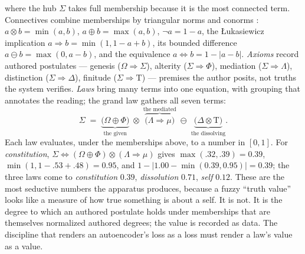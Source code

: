 \documentclass[11pt]{article}
\newcommand{\Tau}{\mathrm{T}}
\begin{document}
where the hub $\Sigma$ takes full membership because it is the most connected term.
Connectives combine memberships by triangular norms and conorms \cite{tnorms}:
$a\otimes b=\min(a,b)$, $a\oplus b=\max(a,b)$, $\neg a=1-a$, the \L ukasiewicz
implication $a\Rightarrow b=\min(1,1-a+b)$, its bounded difference $a\ominus
b=\max(0,a-b)$, and the equivalence $a\Leftrightarrow b=1-|a-b|$. \emph{Axioms}
record authored postulates --- genesis ($\Omega\Rightarrow\Sigma$), alterity
($\Sigma\Rightarrow\Phi$), mediation ($\Sigma\Rightarrow\Lambda$), distinction
($\Sigma\Rightarrow\Delta$), finitude ($\Sigma\Rightarrow\Tau$) --- premises the
author posits, not truths the system verifies. \emph{Laws} bring many terms into
one equation, with grouping that annotates the reading; the grand law gathers all
seven terms:
\begin{equation}
\Sigma \;=\;
\underbrace{\big(\Omega\oplus\Phi\big)}_{\text{the given}} \;\otimes\;
\overbrace{\big(\Lambda\Rightarrow\mu\big)}^{\text{the mediated}} \;\ominus\;
\underbrace{\big(\Delta\otimes\Tau\big)}_{\text{the dissolving}} .
\end{equation}
Each law evaluates, under the memberships above, to a number in $[0,1]$. For
\emph{constitution}, $\Sigma\Leftrightarrow(\Omega\oplus\Phi)\otimes(\Lambda
\Rightarrow\mu)$ gives $\max(.32,.39)=0.39$, $\min(1,1{-}.53{+}.48)=0.95$, and
$1-|1.00-\min(0.39,0.95)|=\boxed{0.39}$; the three laws come to \emph{constitution}
$0.39$, \emph{dissolution} $0.71$, \emph{self} $0.12$. These are the most seductive
numbers the apparatus produces, because a fuzzy ``truth value'' looks like a
measure of how true something is about a self. It is not. It is the degree to which
an authored postulate holds under memberships that are themselves normalized
authored degrees; the value is recorded as data. The discipline that renders an
autoencoder's loss as a loss must render a law's value as a value.
\end{document}
